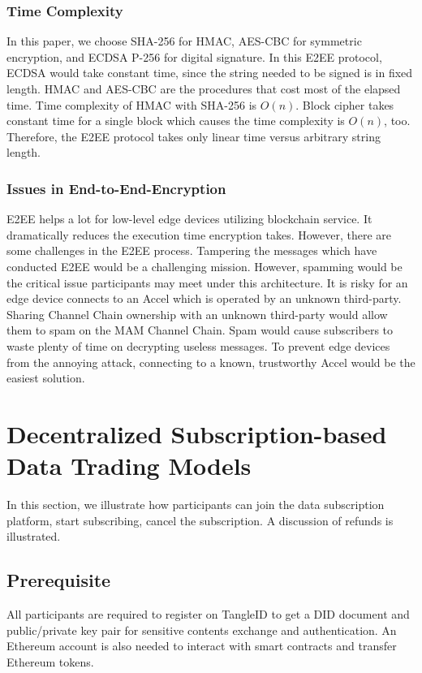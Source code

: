 \documentclass[10pt, conference, compsocconf]{IEEEtran}
\begin{document}
\subsubsection{Time Complexity}
In this paper, we choose SHA-256 for HMAC, AES-CBC for symmetric encryption, and ECDSA P-256 for digital signature. In this E2EE protocol, ECDSA would take constant time, since the string needed to be signed is in fixed length. HMAC and AES-CBC are the procedures that cost most of the elapsed time. Time complexity of HMAC with SHA-256 is $O(n)$.\cite{hmac_time_complexity} Block cipher takes constant time for a single block which causes the time complexity is $O(n)$, too. Therefore, the E2EE protocol takes only linear time versus arbitrary string length.

\subsubsection{Issues in End-to-End-Encryption}
E2EE helps a lot for low-level edge devices utilizing blockchain service. It dramatically reduces the execution time encryption takes. However, there are some challenges in the E2EE process. Tampering the messages which have conducted E2EE would be a challenging mission. However, spamming would be the critical issue participants may meet under this architecture. It is risky for an edge device connects to an Accel which is operated by an unknown third-party. Sharing Channel Chain ownership with an unknown third-party would allow them to spam on the MAM Channel Chain. Spam would cause subscribers to waste plenty of time on decrypting useless messages. To prevent edge devices from the annoying attack, connecting to a known, trustworthy Accel would be the easiest solution.

\section{Decentralized Subscription-based Data Trading Models}
\label{section:trading_model}
In this section, we illustrate how participants can join the data subscription platform, start subscribing, cancel the subscription. A discussion of refunds is illustrated.

\subsection{Prerequisite}
All participants are required to register on TangleID to get a DID document and public/private key pair for sensitive contents exchange and authentication. An Ethereum account is also needed to interact with smart contracts and transfer Ethereum tokens.
\end{document}

